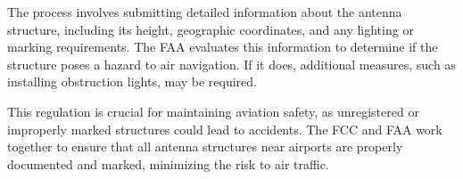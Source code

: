 The process involves submitting detailed information about the antenna structure, including its height, geographic coordinates, and any lighting or marking requirements. The FAA evaluates this information to determine if the structure poses a hazard to air navigation. If it does, additional measures, such as installing obstruction lights, may be required.

This regulation is crucial for maintaining aviation safety, as unregistered or improperly marked structures could lead to accidents. The FCC and FAA work together to ensure that all antenna structures near airports are properly documented and marked, minimizing the risk to air traffic.

